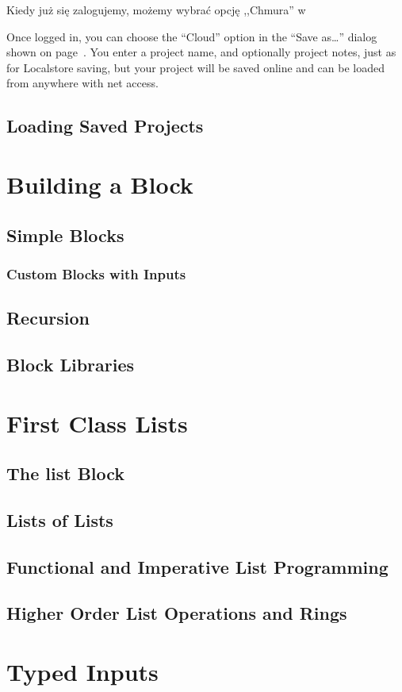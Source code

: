 \documentclass[a4paper]{report}
\begin{document}
Kiedy już się zalogujemy, możemy wybrać opcję ,,Chmura'' w 

Once logged in, you can choose the ``Cloud'' option in the ``Save as\ldots'' dialog shown on page~. You enter a project name, and optionally project notes, just as for Localstore  saving, but your project will be saved online and can be loaded from anywhere with net access.

\section{Loading Saved Projects}
\chapter{Building a Block}
\section{Simple Blocks}
\subsection{Custom Blocks with Inputs}
\section{Recursion}
\section{Block Libraries}
\chapter{First Class Lists}
\section{The list Block}
\section{Lists of Lists}
\section{Functional and Imperative List Programming}
\section{Higher Order List Operations and Rings}
\chapter{Typed Inputs}
\end{document}
